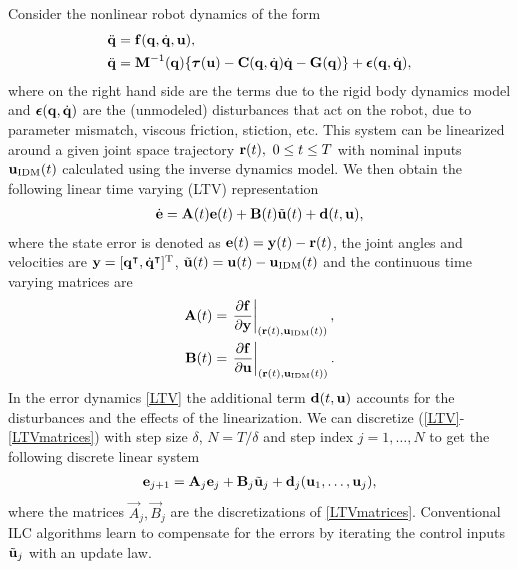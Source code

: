 Consider the nonlinear robot dynamics of the form
%
\begin{equation}
\begin{aligned}
\ddot{\boldsymbol{\mathrm{q}}} &= \boldsymbol{\mathrm{f}}(\boldsymbol{\mathrm{q}},\dot{\boldsymbol{\mathrm{q}}},\boldsymbol{\mathrm{u}}), \\
\ddot{\boldsymbol{\mathrm{q}}} &= \boldsymbol{\mathrm{M}}^{-1}(\boldsymbol{\mathrm{q}})\{ \boldsymbol{\mathrm{\tau}}(\boldsymbol{\mathrm{u}}) - \boldsymbol{\mathrm{C}}(\boldsymbol{\mathrm{q}},\dot{\boldsymbol{\mathrm{q}}})\dot{\boldsymbol{\mathrm{q}}} - \boldsymbol{\mathrm{G}}(\boldsymbol{\mathrm{q}})\} + \boldsymbol{\mathrm{\epsilon}}(\boldsymbol{\mathrm{q}},\dot{\boldsymbol{\mathrm{q}}}),\\
\end{aligned}
\label{dynamics}
\end{equation}
%
\noindent where on the right hand side are the terms due to the rigid body dynamics model and $\boldsymbol{\mathrm{\epsilon}}(\boldsymbol{\mathrm{q}},\dot{\boldsymbol{\mathrm{q}}})$ are the (unmodeled) disturbances that act on the robot, due to parameter mismatch, viscous friction, stiction, etc. This system can be linearized around a given joint space trajectory $\boldsymbol{\mathrm{r}}(t), \ 0 \leq t \leq T$ with nominal inputs $\boldsymbol{\mathrm{u}}_{\mathrm{IDM}}(t)$ calculated using the inverse dynamics model. We then obtain the following linear time varying (LTV) representation
%
\begin{equation}
\begin{aligned}
\dot{\boldsymbol{\mathrm{e}}} = \boldsymbol{\mathrm{A}}(t)\boldsymbol{\mathrm{e}}(t) + \boldsymbol{\mathrm{B}}(t)\tilde{\boldsymbol{\mathrm{u}}}(t) + \boldsymbol{\mathrm{d}}(t,\boldsymbol{\mathrm{u}}),
\end{aligned}
\label{LTV}
\end{equation}
%
\noindent where the state error is denoted as $\boldsymbol{\mathrm{e}}(t) = \boldsymbol{\mathrm{y}}(t) - \boldsymbol{\mathrm{r}}(t)$, the joint angles and velocities are $\boldsymbol{\mathrm{y}} = [\boldsymbol{\mathrm{q}}^{\intercal},\dot{\boldsymbol{\mathrm{q}}}^{\intercal}]^{\mathrm{T}}$, $\tilde{\boldsymbol{\mathrm{u}}}(t) = \boldsymbol{\mathrm{u}}(t) - \boldsymbol{\mathrm{u}}_{\mathrm{IDM}}(t)$ and the continuous time varying matrices are
%
\begin{equation}
\begin{aligned}
\boldsymbol{\mathrm{A}}(t) &= \left.\frac{\partial{\boldsymbol{\mathrm{f}}}}{\partial{\boldsymbol{\mathrm{y}}}}\right|_{(\boldsymbol{\mathrm{r}}(t),\boldsymbol{\mathrm{u}}_{\mathrm{IDM}}(t))}, \\
\boldsymbol{\mathrm{B}}(t) &= \left.\frac{\partial{\boldsymbol{\mathrm{f}}}}{\partial{\boldsymbol{\mathrm{u}}}}\right|_{(\boldsymbol{\mathrm{r}}(t),\boldsymbol{\mathrm{u}}_{\mathrm{IDM}}(t))}.
\end{aligned}
\label{LTVmatrices}
\end{equation}
%
\noindent In the error dynamics \eqref{LTV} the additional term $\boldsymbol{\mathrm{d}}(t,\boldsymbol{\mathrm{u}})$ accounts for the disturbances and the effects of the linearization. We can discretize (\ref{LTV}-\ref{LTVmatrices}) with step size $\delta$, $N = T/\delta$ and step index $j = 1, \ldots, N$ to get the following discrete linear system
%
\begin{equation}
\begin{aligned}
\boldsymbol{\mathrm{e}}_{j+1} = \boldsymbol{\mathrm{A}}_j\boldsymbol{\mathrm{e}}_j + \boldsymbol{\mathrm{B}}_j\tilde{\boldsymbol{\mathrm{u}}}_j + \boldsymbol{\mathrm{d}}_j(\boldsymbol{\mathrm{u}}_1, \ldots, \boldsymbol{\mathrm{u}}_j),
\end{aligned}
\label{discreteLTV}
\end{equation}
%
\noindent where the matrices $\vec{A}_j, \vec{B}_j$ are the discretizations of \eqref{LTVmatrices}. Conventional ILC algorithms learn to compensate for the errors by iterating the control inputs $\tilde{\boldsymbol{\mathrm{u}}}_j$ with an update law.
